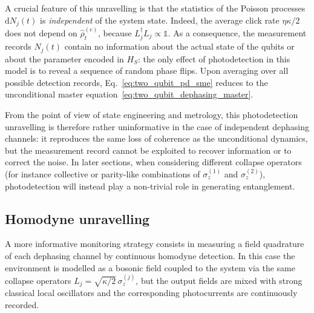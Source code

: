 A crucial feature of this unravelling is that the statistics of the Poisson processes $\mathrm{d}N_j(t)$ is \emph{independent} of the system state.  
Indeed, the average click rate $\eta\kappa/2$ does not depend on $\hat{\rho}_t^{(c)}$, because $L_j^{\dagger}L_j \propto \mathbb{1}$.  
As a consequence, the measurement records $N_j(t)$ contain no information about the actual state of the qubits or about the parameter encoded in $H_S$: the only effect of photodetection in this model is to reveal a sequence of random phase flips.  
Upon averaging over all possible detection records, Eq.~\eqref{eq:two_qubit_pd_sme} reduces to the unconditional master equation~\eqref{eq:two_qubit_dephasing_master}.

From the point of view of state engineering and metrology, this photodetection unravelling is therefore rather uninformative in the case of independent dephasing channels: it reproduces the same loss of coherence as the unconditional dynamics, but the measurement record cannot be exploited to recover information or to correct the noise.  
In later sections, when considering different collapse operators (for instance collective or parity-like combinations of $\sigma_z^{(1)}$ and $\sigma_z^{(2)}$), photodetection will instead play a non-trivial role in generating entanglement.

\subsection{Homodyne unravelling}
\label{subsec:two_qubit_homodyne}

A more informative monitoring strategy consists in measuring a field quadrature of each dephasing channel by continuous homodyne detection.  
In this case the environment is modelled as a bosonic field coupled to the system via the same collapse operators $L_j = \sqrt{\kappa/2}\,\sigma_z^{(j)}$, but the output fields are mixed with strong classical local oscillators and the corresponding photocurrents are continuously recorded.

